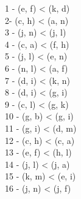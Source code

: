 \documentclass[paper=a4, fontsize=11pt]{scrartcl}
\numberwithin{equation}{section}		%
\numberwithin{figure}{section}			%
\numberwithin{table}{section}				%
\begin{document}
\begin{center}
1 - (e, f) < (k, d)\\
2- (c, h) < (a, n)\\
3 - (j, n) < (j, l)\\
4 - (c, a) < (f, h)\\
5 - (j, l) < (e, n)\\
6 - (n, l) < (a, f)\\
7 - (d, i) < (k, n)\\
8 - (d, i) < (g, i)\\
9 - (c, l) < (g, k)\\
10 - (g, b) < (g, i)\\
11 - (g, i) < (d, m)\\
12 - (c, h) < (c, a)\\
13 - (e, f) < (h, l)\\
14 -  (j, l) < (j, a)\\
15 - (k, m) < (e, i)\\
16 -  (j, n) < (j, f)\\
\end{center}
\end{document}

